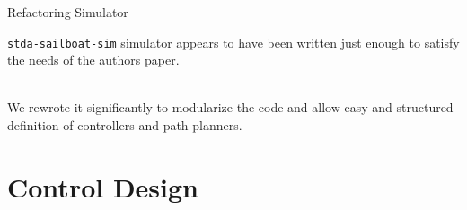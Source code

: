 \documentclass[10pt,xcolor={table,dvipsnames},t]{beamer}
\begin{document}
\begin{frame}{Refactoring Simulator}

    \texttt{stda-sailboat-sim} simulator appears to have been written just enough to satisfy the needs of the authors paper.
    
    \hfill\\
    We rewrote it significantly to modularize the code and allow easy and structured definition
    of controllers and path planners.

\end{frame}



\section{Control Design}
\end{document}

